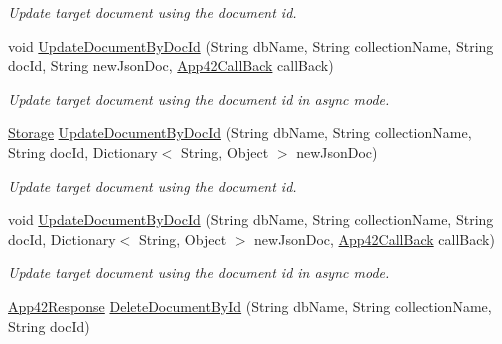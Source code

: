 \begin{DoxyCompactItemize}
\begin{DoxyCompactList}\small\item\em Update target document using the document id. \end{DoxyCompactList}\item 
void \hyperlink{classcom_1_1shephertz_1_1app42_1_1paas_1_1sdk_1_1csharp_1_1storage_1_1_storage_service_abb81912a399d8821f70f581757d2fee3}{Update\+Document\+By\+Doc\+Id} (String db\+Name, String collection\+Name, String doc\+Id, String new\+Json\+Doc, \hyperlink{interfacecom_1_1shephertz_1_1app42_1_1paas_1_1sdk_1_1csharp_1_1_app42_call_back}{App42\+Call\+Back} call\+Back)
\begin{DoxyCompactList}\small\item\em Update target document using the document id in async mode. \end{DoxyCompactList}\item 
\hyperlink{classcom_1_1shephertz_1_1app42_1_1paas_1_1sdk_1_1csharp_1_1storage_1_1_storage}{Storage} \hyperlink{classcom_1_1shephertz_1_1app42_1_1paas_1_1sdk_1_1csharp_1_1storage_1_1_storage_service_a875ba45cadce0010ff5e9aa2352920f4}{Update\+Document\+By\+Doc\+Id} (String db\+Name, String collection\+Name, String doc\+Id, Dictionary$<$ String, Object $>$ new\+Json\+Doc)
\begin{DoxyCompactList}\small\item\em Update target document using the document id. \end{DoxyCompactList}\item 
void \hyperlink{classcom_1_1shephertz_1_1app42_1_1paas_1_1sdk_1_1csharp_1_1storage_1_1_storage_service_aadd96c123cf841497fee3ba7b04646ef}{Update\+Document\+By\+Doc\+Id} (String db\+Name, String collection\+Name, String doc\+Id, Dictionary$<$ String, Object $>$ new\+Json\+Doc, \hyperlink{interfacecom_1_1shephertz_1_1app42_1_1paas_1_1sdk_1_1csharp_1_1_app42_call_back}{App42\+Call\+Back} call\+Back)
\begin{DoxyCompactList}\small\item\em Update target document using the document id in async mode. \end{DoxyCompactList}\item 
\hypertarget{classcom_1_1shephertz_1_1app42_1_1paas_1_1sdk_1_1csharp_1_1storage_1_1_storage_service_aec973386c0ac6141f7444a7424edbb1d}{\hyperlink{classcom_1_1shephertz_1_1app42_1_1paas_1_1sdk_1_1csharp_1_1_app42_response}{App42\+Response} \hyperlink{classcom_1_1shephertz_1_1app42_1_1paas_1_1sdk_1_1csharp_1_1storage_1_1_storage_service_aec973386c0ac6141f7444a7424edbb1d}{Delete\+Document\+By\+Id} (String db\+Name, String collection\+Name, String doc\+Id)}\label{classcom_1_1shephertz_1_1app42_1_1paas_1_1sdk_1_1csharp_1_1storage_1_1_storage_service_aec973386c0ac6141f7444a7424edbb1d}


\end{DoxyCompactItemize}
